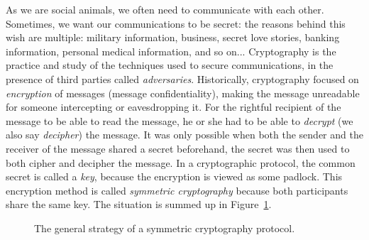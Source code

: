 As we are social animals, we often need to communicate with each other.
Sometimes, we want our communications to be secret: the reasons behind this
wish are multiple: military information, business, secret love stories, banking
information, personal medical information, and so on... Cryptography is the
practice and study of the techniques used to secure communications, in the
presence of third parties called \emph{adversaries}. Historically, cryptography
focused on \emph{encryption} of messages (message confidentiality), \ie making
the message unreadable for someone intercepting or eavesdropping it. For the
rightful recipient of the message to be able to read the message, he or she had
to be able to \emph{decrypt} (we also say \emph{decipher}) the message. It was
only possible when both the sender and the receiver of the message shared a
secret beforehand, the secret was then used to both cipher and decipher the
message. In a cryptographic protocol, the common secret is called a
\emph{key}, because the encryption is viewed as some padlock. This encryption
method is called \emph{symmetric cryptography} because both participants share
the same key. The situation is summed up in Figure~\ref{fig:crypto-sym}.
\begin{figure}[h]
  \centering
  \caption{The general strategy of a symmetric cryptography protocol.}
  \label{fig:crypto-sym}
\end{figure}

